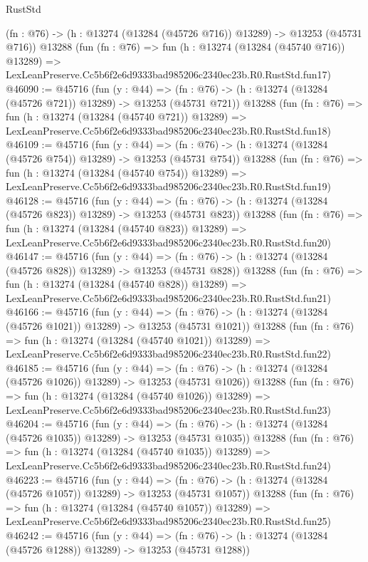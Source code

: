 \begin{lexlean}{RustStd}
\begin{coremodule}
    (fn : @76) -> (h : @13274 (@13284 (@45726 @716)) @13289) -> @13253 (@45731 @716))
    @13288
    (fun (fn : @76) =>
    fun (h : @13274 (@13284 (@45740 @716)) @13289) =>
    LexLeanPreserve.Cc5b6f2e6d9333bad985206c2340ec23b.R0.RustStd.fun17)
@46090 := @45716
    (fun (y : @44) =>
    (fn : @76) -> (h : @13274 (@13284 (@45726 @721)) @13289) -> @13253 (@45731 @721))
    @13288
    (fun (fn : @76) =>
    fun (h : @13274 (@13284 (@45740 @721)) @13289) =>
    LexLeanPreserve.Cc5b6f2e6d9333bad985206c2340ec23b.R0.RustStd.fun18)
@46109 := @45716
    (fun (y : @44) =>
    (fn : @76) -> (h : @13274 (@13284 (@45726 @754)) @13289) -> @13253 (@45731 @754))
    @13288
    (fun (fn : @76) =>
    fun (h : @13274 (@13284 (@45740 @754)) @13289) =>
    LexLeanPreserve.Cc5b6f2e6d9333bad985206c2340ec23b.R0.RustStd.fun19)
@46128 := @45716
    (fun (y : @44) =>
    (fn : @76) -> (h : @13274 (@13284 (@45726 @823)) @13289) -> @13253 (@45731 @823))
    @13288
    (fun (fn : @76) =>
    fun (h : @13274 (@13284 (@45740 @823)) @13289) =>
    LexLeanPreserve.Cc5b6f2e6d9333bad985206c2340ec23b.R0.RustStd.fun20)
@46147 := @45716
    (fun (y : @44) =>
    (fn : @76) -> (h : @13274 (@13284 (@45726 @828)) @13289) -> @13253 (@45731 @828))
    @13288
    (fun (fn : @76) =>
    fun (h : @13274 (@13284 (@45740 @828)) @13289) =>
    LexLeanPreserve.Cc5b6f2e6d9333bad985206c2340ec23b.R0.RustStd.fun21)
@46166 := @45716
    (fun (y : @44) =>
    (fn : @76) -> (h : @13274 (@13284 (@45726 @1021)) @13289) -> @13253 (@45731 @1021))
    @13288
    (fun (fn : @76) =>
    fun (h : @13274 (@13284 (@45740 @1021)) @13289) =>
    LexLeanPreserve.Cc5b6f2e6d9333bad985206c2340ec23b.R0.RustStd.fun22)
@46185 := @45716
    (fun (y : @44) =>
    (fn : @76) -> (h : @13274 (@13284 (@45726 @1026)) @13289) -> @13253 (@45731 @1026))
    @13288
    (fun (fn : @76) =>
    fun (h : @13274 (@13284 (@45740 @1026)) @13289) =>
    LexLeanPreserve.Cc5b6f2e6d9333bad985206c2340ec23b.R0.RustStd.fun23)
@46204 := @45716
    (fun (y : @44) =>
    (fn : @76) -> (h : @13274 (@13284 (@45726 @1035)) @13289) -> @13253 (@45731 @1035))
    @13288
    (fun (fn : @76) =>
    fun (h : @13274 (@13284 (@45740 @1035)) @13289) =>
    LexLeanPreserve.Cc5b6f2e6d9333bad985206c2340ec23b.R0.RustStd.fun24)
@46223 := @45716
    (fun (y : @44) =>
    (fn : @76) -> (h : @13274 (@13284 (@45726 @1057)) @13289) -> @13253 (@45731 @1057))
    @13288
    (fun (fn : @76) =>
    fun (h : @13274 (@13284 (@45740 @1057)) @13289) =>
    LexLeanPreserve.Cc5b6f2e6d9333bad985206c2340ec23b.R0.RustStd.fun25)
@46242 := @45716
    (fun (y : @44) =>
    (fn : @76) -> (h : @13274 (@13284 (@45726 @1288)) @13289) -> @13253 (@45731 @1288))

\end{coremodule}
\end{lexlean}
